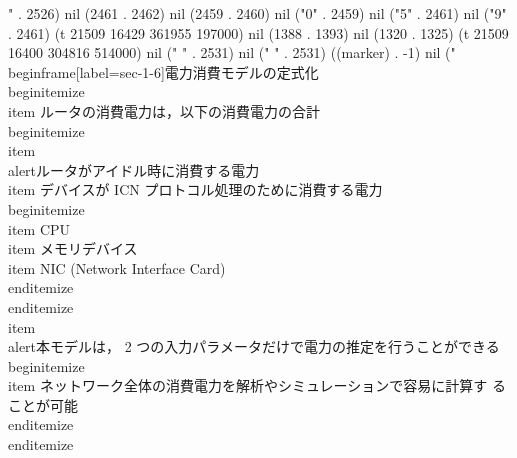 {" . 2526) nil (2461 . 2462) nil (2459 . 2460) nil ("0" . 2459) nil ("5" . 2461) nil ("9" . 2461) (t 21509 16429 361955 197000) nil (1388 . 1393) nil (1320 . 1325) (t 21509 16400 304816 514000) nil ("
" . 2531) nil ("
" . 2531) ((marker) . -1) nil ("\\begin{frame}[label=sec-1-6]{電力消費モデルの定式化}
\\begin{itemize}
\\item ルータの消費電力は，以下の消費電力の合計
\\begin{itemize}
\\item \\alert{ルータがアイドル時に消費する電力}
\\item デバイスが ICN プロトコル処理のために消費する電力
\\begin{itemize}
\\item CPU
\\item メモリデバイス
\\item NIC (Network Interface Card)
\\end{itemize}
\\end{itemize}
\\item \\alert{本モデルは， 2 つの入力パラメータだけで電力の推定を行うことができる}
\\begin{itemize}
\\item ネットワーク全体の消費電力を解析やシミュレーションで容易に計算す
ることが可能
\\end{itemize}
\\end{itemize}

}
